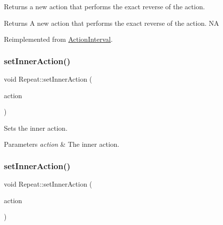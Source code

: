 Returns a new action that performs the exact reverse of the action.

\begin{DoxyReturn}{Returns}
A new action that performs the exact reverse of the action.  NA 
\end{DoxyReturn}


Reimplemented from \hyperlink{classActionInterval_a9f9ac7164036a0bc261a72f62a2b2da7}{Action\+Interval}.

\mbox{\label{classRepeat_a478e724496a209ad21dc17d69641b46e}} 
\subsubsection{\texorpdfstring{set\+Inner\+Action()}{setInnerAction()}\hspace{0.1cm}{\footnotesize\ttfamily [1/2]}}
{\footnotesize\ttfamily void Repeat\+::set\+Inner\+Action (\begin{DoxyParamCaption}\item[{\hyperlink{classFiniteTimeAction}{Finite\+Time\+Action} $\ast$}]{action }\end{DoxyParamCaption})\hspace{0.3cm}{\ttfamily [inline]}}

Sets the inner action.


\begin{DoxyParams}{Parameters}
{\em action} & The inner action. \\
\hline
\end{DoxyParams}
\mbox{\label{classRepeat_a478e724496a209ad21dc17d69641b46e}} 
\subsubsection{\texorpdfstring{set\+Inner\+Action()}{setInnerAction()}\hspace{0.1cm}{\footnotesize\ttfamily [2/2]}}
{\footnotesize\ttfamily void Repeat\+::set\+Inner\+Action (\begin{DoxyParamCaption}\item[{\hyperlink{classFiniteTimeAction}{Finite\+Time\+Action} $\ast$}]{action }\end{DoxyParamCaption})\hspace{0.3cm}{\ttfamily [inline]}}

